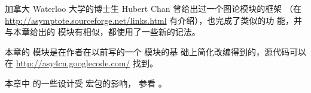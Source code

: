 加拿大 Waterloo 大学的博士生 Hubert Chan 曾给出过一个图论模块的框架
（在
\url{http://asymptote.sourceforge.net/links.html} 有介绍），也完成了类似的功
能，并与本章给出的  模块有相似，都使用了一些新的记法。

本章的  模块是在作者在以前写的一个  模块的基
础上简化改编得到的，源代码可以在 \url{http://asy4cn.googlecode.com/} 找到。

本章中  的一些设计受  宏包的影响，
参看 \cite{pgfman}。


\endinput


